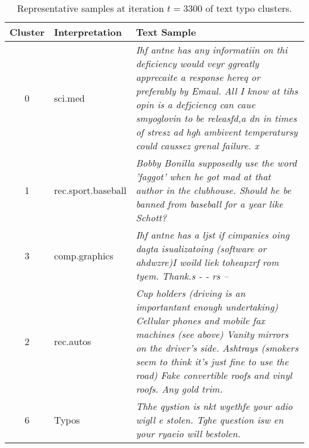 \begin{table}[H]
    \centering
    \scriptsize %
    \renewcommand{\arraystretch}{0.9} %
    \setlength{\tabcolsep}{4pt} %
    \begin{tabularx}{\linewidth}{c|l|X}
        \hline
        \textbf{Cluster} & \textbf{Interpretation} & \textbf{Text Sample} \\
        \hline
        0 & sci.med & \emph{Ihf antne has any informatiin on thi deficiency would veyr ggreatly apprecaite a response hereq or preferably by Emaul. All I know at tihs opin is a defjciencg can caue smyoglovin to be releasfd,a dn in times of stresz ad hgh ambivent temperatursy could caussez grenal failure. x} \\
        \hline
        1 & rec.sport.baseball & \emph{Bobby Bonilla supposedly use the word 'faggot' when he got mad at that author in the clubhouse. Should he be banned from baseball for a year like Schott?} \\
        \hline
        3 & comp.graphics & \emph{Ihf antne has a ljst if cimpanies oing dagta isualizatoing (software or ahdwzre)I woild liek toheapzrf rom tyem. Thank.s - - rs --} \\
        \hline
        2 & rec.autos & \emph{Cup holders (driving is an importantant enough undertaking) Cellular phones and mobile fax machines (see above) Vanity mirrors on the driver's side. Ashtrays (smokers seem to think it's just fine to use the road) Fake convertible roofs and vinyl roofs. Any gold trim.} \\
        \hline
        6 & Typos & \emph{Thhe qystion is nkt wgethfe your adio wigll e stolen. Tghe question isw en your ryaeio will bestolen.} \\
        \hline
    \end{tabularx}
    \caption{Representative samples at iteration $t=3300$ of text typo clusters.}
\end{table}
